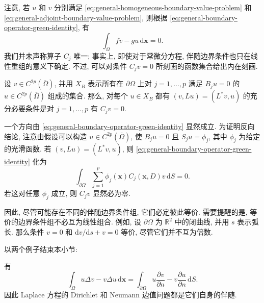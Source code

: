 注意, 若 $u$ 和 $v$ 分别满足 \eqref{eq:general-homogeneous-boundary-value-problem} 和 \eqref{eq:general-adjoint-boundary-value-problem}, 则根据 \eqref{eq:general-boundary-operator-green-identity}, 有
\begin{equation}\label{eq:adjoint-solutions-forcing-orthogonality}
\int_\Omega fv-gu\,\mathrm{d}\bm{x}=0.
\end{equation}
我们并未声称算子 $C_j$ 唯一; 事实上, 即使对于常微分方程, 伴随边界条件也只在线性重组的意义下确定. 不过, 可以对条件 $C_jv=0$ 所刻画的函数集合给出内在刻画.

\begin{Lemma}
\label{lem:adjoint-boundary-intrinsic-characterization}
设 $v\in C^{2p}(\overline\Omega)$, 并用 $X_B$ 表示所有在 $\partial\Omega$ 上对 $j=1,\ldots,p$ 满足 $B_ju=0$ 的 $u\in C^{2p}(\overline\Omega)$ 组成的集合. 那么, 对每个 $u\in X_B$ 都有 $(v,Lu)=(L^*v,u)$ 的充分必要条件是对 $j=1,\ldots,p$ 有 $C_jv=0$.
\end{Lemma}

\begin{Proof}
一个方向由 \eqref{eq:general-boundary-operator-green-identity} 显然成立. 为证明反向结论, 注意由假设可以构造 $u\in C^{2p}(\overline\Omega)$, 使 $B_ju=0$ 且 $S_ju=\phi_j$, 其中 $\phi_j$ 为给定的光滑函数. 若 $(v,Lu)=(L^*v,u)$, 则 \eqref{eq:general-boundary-operator-green-identity} 化为
\begin{equation}\label{eq:adjoint-boundary-conditions-test-identity}
\int_{\partial\Omega}\sum_{j=1}^p\phi_j(\bm{x})C_j(\bm{x},D)v\,\mathrm{d}S=0.
\end{equation}
若这对任意 $\phi_j$ 成立, 则 $C_jv$ 显然必为零.
\end{Proof}

因此, 尽管可能存在不同的伴随边界条件组, 它们必定彼此等价. 需要提醒的是, 等价的边界条件组不必互为线性组合. 例如, 设 $\partial\Omega$ 为 $\mathbb{R}^2$ 中的闭曲线, 并用 $s$ 表示弧长. 那么条件 $v=0$ 和 $\mathrm{d}v/\mathrm{d}s+v=0$ 等价, 尽管它们并不互为倍数.

以两个例子结束本小节:

\begin{Example}
\label{ex:laplace-dirichlet-neumann-self-adjoint}
有
\begin{equation}\label{eq:laplace-dirichlet-neumann-green-identity}
\int_\Omega u\Delta v-v\Delta u\,\mathrm{d}\bm{x}=\int_{\partial\Omega}u\dfrac{\partial v}{\partial n}-v\dfrac{\partial u}{\partial n}\,\mathrm{d}S.
\end{equation}
因此 Laplace 方程的 Dirichlet 和 Neumann 边值问题都是它们自身的伴随.
\end{Example}

